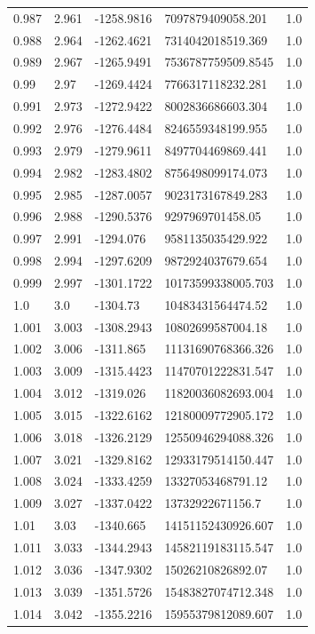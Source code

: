 \begin{tabular}{lllll}
0.987 & 2.961 & -1258.9816 & 7097879409058.201 & 1.0 \\
0.988 & 2.964 & -1262.4621 & 7314042018519.369 & 1.0 \\
0.989 & 2.967 & -1265.9491 & 7536787759509.8545 & 1.0 \\
0.99 & 2.97 & -1269.4424 & 7766317118232.281 & 1.0 \\
0.991 & 2.973 & -1272.9422 & 8002836686603.304 & 1.0 \\
0.992 & 2.976 & -1276.4484 & 8246559348199.955 & 1.0 \\
0.993 & 2.979 & -1279.9611 & 8497704469869.441 & 1.0 \\
0.994 & 2.982 & -1283.4802 & 8756498099174.073 & 1.0 \\
0.995 & 2.985 & -1287.0057 & 9023173167849.283 & 1.0 \\
0.996 & 2.988 & -1290.5376 & 9297969701458.05 & 1.0 \\
0.997 & 2.991 & -1294.076 & 9581135035429.922 & 1.0 \\
0.998 & 2.994 & -1297.6209 & 9872924037679.654 & 1.0 \\
0.999 & 2.997 & -1301.1722 & 10173599338005.703 & 1.0 \\
1.0 & 3.0 & -1304.73 & 10483431564474.52 & 1.0 \\
1.001 & 3.003 & -1308.2943 & 10802699587004.18 & 1.0 \\
1.002 & 3.006 & -1311.865 & 11131690768366.326 & 1.0 \\
1.003 & 3.009 & -1315.4423 & 11470701222831.547 & 1.0 \\
1.004 & 3.012 & -1319.026 & 11820036082693.004 & 1.0 \\
1.005 & 3.015 & -1322.6162 & 12180009772905.172 & 1.0 \\
1.006 & 3.018 & -1326.2129 & 12550946294088.326 & 1.0 \\
1.007 & 3.021 & -1329.8162 & 12933179514150.447 & 1.0 \\
1.008 & 3.024 & -1333.4259 & 13327053468791.12 & 1.0 \\
1.009 & 3.027 & -1337.0422 & 13732922671156.7 & 1.0 \\
1.01 & 3.03 & -1340.665 & 14151152430926.607 & 1.0 \\
1.011 & 3.033 & -1344.2943 & 14582119183115.547 & 1.0 \\
1.012 & 3.036 & -1347.9302 & 15026210826892.07 & 1.0 \\
1.013 & 3.039 & -1351.5726 & 15483827074712.348 & 1.0 \\
1.014 & 3.042 & -1355.2216 & 15955379812089.607 & 1.0 \\

\end{tabular}
